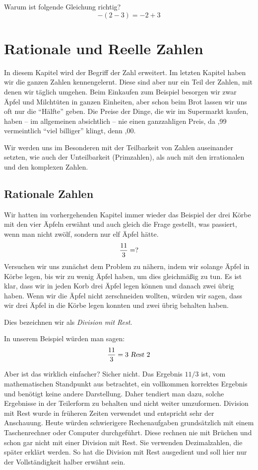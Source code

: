 \begin{prob}
\label{arith.1.4}
Warum ist folgende Gleichung richtig?
\[ -(2-3) = -2+3 \]
\end{prob}


\chapter{Rationale und Reelle Zahlen}

In diesem Kapitel wird der Begriff der Zahl erweitert. Im letzten Kapitel haben wir die ganzen Zahlen kennengelernt. Diese sind aber nur ein Teil der Zahlen, mit denen wir täglich umgehen. Beim Einkaufen zum Beispiel besorgen wir zwar Äpfel und Milchtüten in ganzen Einheiten, aber schon beim Brot lassen wir uns oft nur die "`Hälfte"' geben. Die Preise der Dinge, die wir im Supermarkt kaufen, haben -- im allgemeinen absichtlich -- nie einen ganzzahligen Preis, da ,99 vermeintlich "`viel billiger"' klingt, denn ,00.

Wir werden uns im Besonderen mit der Teilbarkeit von Zahlen auseinander setzten, wie auch der Unteilbarkeit (Primzahlen), als auch mit den irrationalen und den komplexen Zahlen.

\section{Rationale Zahlen}

Wir hatten im vorhergehenden Kapitel immer wieder das Beispiel der drei Körbe mit den vier Äpfeln erwähnt und auch gleich die Frage gestellt, was passiert, wenn man nicht zwölf, sondern nur elf Äpfel hätte.
\[ {11 \over 3} = ? \]
Versuchen wir uns zunächst dem Problem zu nähern, indem wir solange Äpfel in Körbe legen, bis wir zu wenig Äpfel haben, um dies gleichmäßig zu tun. Es ist klar, dass wir in jeden Korb drei Äpfel legen können und danach zwei übrig haben. Wenn wir die Äpfel nicht zerschneiden wollten, würden wir sagen, dass wir drei Äpfel in die Körbe legen konnten und zwei übrig behalten haben. 

\begin{definition}
Dies bezeichnen wir als \textsl{Division mit Rest}. 
\end{definition}
In unserem Beispiel würden man sagen:
\[ {11\over 3} = 3 \textsl{ Rest } 2 \]

Aber ist das wirklich einfacher? Sicher nicht. Das Ergebnis $11/3$ ist, vom mathematischen Standpunkt aus betrachtet, ein vollkommen korrektes Ergebnis und benötigt keine andere Darstellung. Daher tendiert man dazu, solche Ergebnisse in der Teilerform zu behalten und nicht weiter umzuformen. Division mit Rest wurde in früheren Zeiten verwendet und entspricht sehr der Anschauung. Heute würden schwierigere Rechenaufgaben grundsätzlich mit einem Taschenrechner oder Computer durchgeführt. Diese rechnen nie mit Brüchen und schon gar nicht mit einer Division mit Rest. Sie verwenden Dezimalzahlen, die später erklärt werden. So hat die Division mit Rest ausgedient und soll hier nur der Vollständigkeit halber erwähnt sein.

